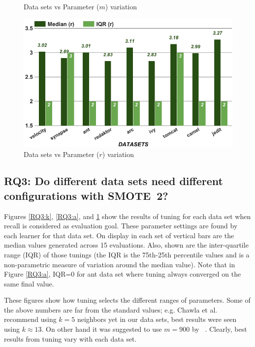 \begin{figure}[!t]
\begin{minipage}{.33\textwidth}
        \caption{Data sets vs Parameter ($m$) variation}
        \label{RQ3:a}
    \end{minipage}
    \begin{minipage}{.33\textwidth}
        \captionsetup{labelsep=space,justification=centering,singlelinecheck=off}
        \includegraphics[width=.95\linewidth]{./fig/r.png}
        \caption{Data sets vs Parameter ($r$) variation}
        \label{RQ3:b}
    \end{minipage}
\end{figure}

\subsection{\textbf{RQ3: Do different data sets
      need different configurations with SMOTE~2?}}

Figures \ref{RQ3:k}, \ref{RQ3:a}, and \ref{RQ3:b} show the results of tuning for each data set when recall is considered as evaluation goal. These parameter settings are found by each learner for that data set.
On display in each set of vertical bars are
the median values generated across 15 evaluations.
Also, shown are
the inter-quartile range (IQR) of those tunings (the IQR is the 75th-25th percentile values and is a non-parametric measure of variation
around the median value). Note that in Figure \ref{RQ3:a}, IQR=0 for  ant data set where tuning
          always converged on the same final value.

  These figures
show how tuning selects the different ranges  of
parameters.
Some of the above numbers are far from the standard values; e.g. Chawla et al.~\cite{chawla2002smote} recommend using $k=5$ neighbors yet in our data sets, best results were seen using $k \approx 13$. On other hand it was suggested to use $m=900$ by ~\cite{pears2014synthetic}.
Clearly,
best results from tuning
vary with each data set.

